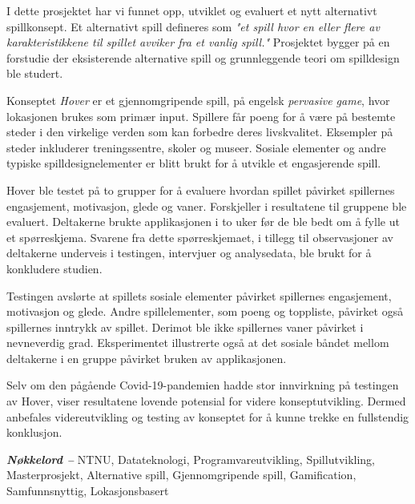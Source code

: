 I dette prosjektet har vi funnet opp, utviklet og evaluert et nytt alternativt spillkonsept. Et alternativt spill defineres som \textit{"et spill hvor en eller flere av karakteristikkene til spillet avviker fra et vanlig spill."} Prosjektet bygger på en forstudie der eksisterende alternative spill og grunnleggende teori om spilldesign ble studert.

Konseptet \textit{Hover} er et gjennomgripende spill, på engelsk \textit{pervasive game}, hvor lokasjonen brukes som primær input. Spillere får poeng for å være på bestemte steder i den virkelige verden som kan forbedre deres livskvalitet. Eksempler på steder inkluderer treningssentre, skoler og museer. Sosiale elementer og andre typiske spilldesignelementer er blitt brukt for å utvikle et engasjerende spill.

Hover ble testet på to grupper for å evaluere hvordan spillet påvirket spillernes engasjement, motivasjon, glede og vaner. Forskjeller i resultatene til gruppene ble evaluert. Deltakerne brukte applikasjonen i to uker før de ble bedt om å fylle ut et spørreskjema. Svarene fra dette spørreskjemaet, i tillegg til observasjoner av deltakerne underveis i testingen, intervjuer og analysedata, ble brukt for å konkludere studien.

Testingen avslørte at spillets sosiale elementer påvirket spillernes engasjement, motivasjon og glede. Andre spillelementer, som poeng og toppliste, påvirket også spillernes inntrykk av spillet. Derimot ble ikke spillernes vaner påvirket i nevneverdig grad. Eksperimentet illustrerte også at det sosiale båndet mellom deltakerne i en gruppe påvirket bruken av applikasjonen.

Selv om den pågående Covid-19-pandemien hadde stor innvirkning på testingen av Hover, viser resultatene lovende potensial for videre konseptutvikling. Dermed anbefales videreutvikling og testing av konseptet for å kunne trekke en fullstendig konklusjon.

\par\vspace*{\fill} %
\textbf{\textit{Nøkkelord --}} NTNU, Datateknologi, Programvareutvikling, Spillutvikling, Masterprosjekt, Alternative spill, Gjennomgripende spill, Gamification, Samfunnsnyttig, Lokasjonsbasert %